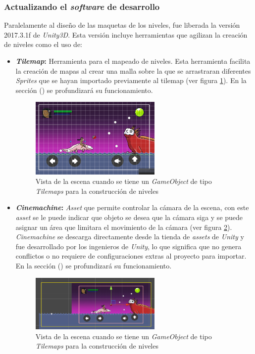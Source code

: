 \subsubsection{Actualizando el \textit{software} de desarrollo}
Paralelamente al diseño de las maquetas de los niveles, fue liberada la versión 
2017.3.1f de \textit{Unity3D}. Esta versión incluye herramientas que agilizan la 
creación de niveles como el uso de: 
	\begin{itemize}
		\item \textbf{\textit{Tilemap}:} Herramienta para el mapeado de niveles. Esta 
		herramienta facilita la creación de mapas al crear una malla sobre la que 
		se arrastraran diferentes \textit{Sprites} que se hayan importado previamente 
		al tilemap (ver figura \ref{fig:TilemapPantalla}). En la sección () se 
		profundizará su funcionamiento.
		
		\begin{figure}[h]
    			\centering
    			\includegraphics[width=0.6\textwidth]{05TrabajoReali/imagenes/tilemaps01.png}
    			\caption{Vista de la escena cuando se tiene un \textit{GameObject} de 
    			tipo \textit{Tilemaps} para la construcción de niveles}
    			\label{fig:TilemapPantalla}
			\end{figure}
		
		\item \textbf{\textit{Cinemachine}:} \textit{Asset} que permite controlar la 
		cámara de la escena, con este \textit{asset} se le puede indicar que objeto se 
		desea que la cámara siga y se puede asignar un área que limitara el movimiento 
		de la cámara (ver figura \ref{fig:CinemaPantalla}). \textit{Cinemachine} se 
		descarga directamente desde la tienda de \textit{assets} de \textit{Unity} y 
		fue desarrollado por los ingenieros de \textit{Unity}, lo que significa que 
		no genera conflictos o no requiere de configuraciones extras al proyecto para 
		importar. En la sección () se profundizará su funcionamiento.
			
			\begin{figure}[h]
    			\centering
    			\includegraphics[width=0.6\textwidth]{05TrabajoReali/imagenes/cinemachine01.png}
    			\caption{Vista de la escena cuando se tiene un \textit{GameObject} de 
    			tipo \textit{Tilemaps} para la construcción de niveles}
    			\label{fig:CinemaPantalla}
			\end{figure}


\end{itemize}
